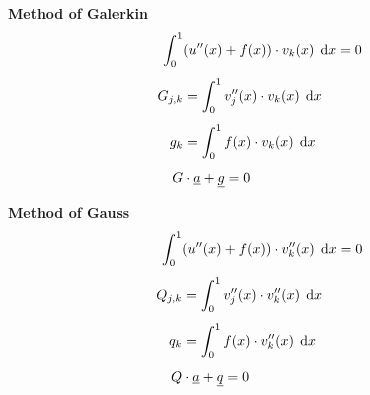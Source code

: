 \documentclass[
final,
a4paper,
oneside,
parskip=full,
headings=standardclasses,
headings=big,
pointednumbers,
fleqn
]{scrartcl}
\newcommand*\difx{\; \mathop{}\!\mathrm{d}x}
\newcommand{\kl}[1]{{\left( #1 \right)}}
\begin{document}
    {\bf{Method of Galerkin}} \\
    {\setlength{\abovedisplayskip}{-6pt}
    \setlength{\belowdisplayskip}{-12pt}
    \begin{align*}
        \int_{0}^{1}&{\kl{u''\kl{x} + f\kl{x}} \cdot v_k\kl{x} \difx} = 0  \\[0.15cm]
        G_{j,k} & = \int_{0}^{1}{v_j''\kl{x} \cdot v_k\kl{x} \difx}  \\[0.15cm]
        g_k &= \int_{0}^{1}{f\kl{x} \cdot v_k\kl{x} \difx}   \\[0.15cm]
        G &\cdot \uline{a} + \uline{g} = 0
    \end{align*}}
    
    {\bf{Method of Gauss}} \\
    {\setlength{\abovedisplayskip}{-6pt}
    \setlength{\belowdisplayskip}{-12pt}
    \begin{align*}
        \int_{0}^{1}&{\kl{u''\kl{x} + f\kl{x}} \cdot v_k''\kl{x} \difx} = 0  \\[0.15cm]
        Q_{j,k} & = \int_{0}^{1}{v_j''\kl{x} \cdot v_k''\kl{x} \difx}  \\[0.15cm]
        q_k & = \int_{0}^{1}{f\kl{x} \cdot v_k''\kl{x} \difx}   \\[0.15cm]
        Q &\cdot \uline{a} + \uline{q} = 0
    \end{align*}} \\
    
    
    \newpage
    
\end{document}
